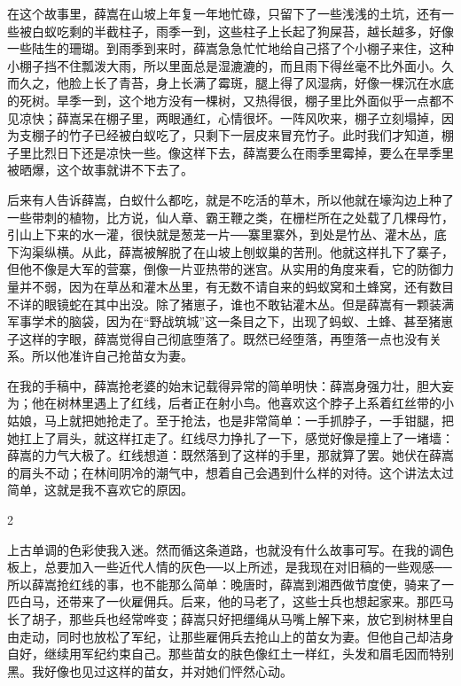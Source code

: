 在这个故事里，薛嵩在山坡上年复一年地忙碌，只留下了一些浅浅的土坑，还有一些被白蚁吃剩的半截柱子，雨季一到，这些柱子上长起了狗屎苔，越长越多，好像一些陆生的珊瑚。到雨季到来时，薛嵩急急忙忙地给自己搭了个小棚子来住，这种小棚子挡不住瓢泼大雨，所以里面总是湿漉漉的，而且雨下得丝毫不比外面小。久而久之，他脸上长了青苔，身上长满了霉斑，腿上得了风湿病，好像一棵沉在水底的死树。旱季一到，这个地方没有一棵树，又热得很，棚子里比外面似乎一点都不见凉快；薛嵩呆在棚子里，两眼通红，心情很坏。一阵风吹来，棚子立刻塌掉，因为支棚子的竹子已经被白蚁吃了，只剩下一层皮来冒充竹子。此时我们才知道，棚子里比烈日下还是凉快一些。像这样下去，薛嵩要么在雨季里霉掉，要么在旱季里被晒爆，这个故事就讲不下去了。 

后来有人告诉薛嵩，白蚁什么都吃，就是不吃活的草木，所以他就在壕沟边上种了一些带刺的植物，比方说，仙人章、霸王鞭之类，在栅栏所在之处载了几棵母竹，引山上下来的水一灌，很快就是葱茏一片──寨里寨外，到处是竹丛、灌木丛，底下沟渠纵横。从此，薛嵩被解脱了在山坡上刨蚁巢的苦刑。他就这样扎下了寨子，但他不像是大军的营寨，倒像一片亚热带的迷宫。从实用的角度来看，它的防御力量并不弱，因为在草丛和灌木丛里，有无数不请自来的蚂蚁窝和土蜂窝，还有数目不详的眼镜蛇在其中出没。除了猪崽子，谁也不敢钻灌木丛。但是薛嵩有一颗装满军事学术的脑袋，因为在“野战筑城”这一条目之下，出现了蚂蚁、土蜂、甚至猪崽子这样的字眼，薛嵩觉得自己彻底堕落了。既然已经堕落，再堕落一点也没有关系。所以他准许自己抢苗女为妻。 

在我的手稿中，薛嵩抢老婆的始末记载得异常的简单明快：薛嵩身强力壮，胆大妄为；他在树林里遇上了红线，后者正在射小鸟。他喜欢这个脖子上系着红丝带的小姑娘，马上就把她抢走了。至于抢法，也是非常简单：一手抓脖子，一手钳腿，把她扛上了肩头，就这样扛走了。红线尽力挣扎了一下，感觉好像是撞上了一堵墙：薛嵩的力气大极了。红线想道：既然落到了这样的手里，那就算了罢。她伏在薛嵩的肩头不动；在林间阴冷的潮气中，想着自己会遇到什么样的对待。这个讲法太过简单，这就是我不喜欢它的原因。 

2 

上古单调的色彩使我入迷。然而循这条道路，也就没有什么故事可写。在我的调色板上，总要加入一些近代人情的灰色──以上所述，是我现在对旧稿的一些观感──所以薛嵩抢红线的事，也不能那么简单：晚唐时，薛嵩到湘西做节度使，骑来了一匹白马，还带来了一伙雇佣兵。后来，他的马老了，这些士兵也想起家来。那匹马长了胡子，那些兵也经常哗变；薛嵩只好把缰绳从马嘴上解下来，放它到树林里自由走动，同时也放松了军纪，让那些雇佣兵去抢山上的苗女为妻。但他自己却洁身自好，继续用军纪约束自己。那些苗女的肤色像红土一样红，头发和眉毛因而特别黑。我好像也见过这样的苗女，并对她们怦然心动。 

